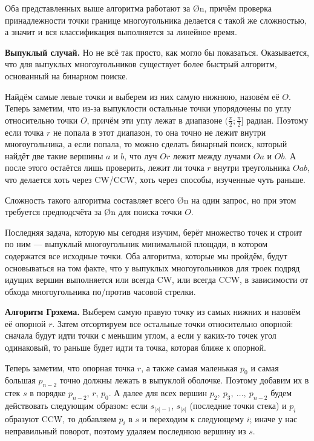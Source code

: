 Оба представленных выше алгоритма работают за \O{n}, причём проверка принадлежности точки границе многоугольника делается с такой же сложностью, а значит и вся классификация выполняется за линейное время.

\textbf{Выпуклый случай.} Но не всё так просто, как могло бы показаться. Оказывается, что для выпуклых многоугольников существует более быстрый алгоритм, основанный на бинарном поиске.

Найдём самые левые точки и выберем из них самую нижнюю, назовём её $O$. Теперь заметим, что из-за выпуклости остальные точки упорядочены по углу относительно точки $O$, причём эти углу лежат в диапазоне $(\frac{\pi}{2}; \frac{\pi}{2}]$ радиан. Поэтому если точка $r$ не попала в этот диапазон, то она точно не лежит внутри многоугольника, а если попала, то можно сделать бинарный поиск, который найдёт две такие вершины $a$ и $b$, что луч $Or$ лежит между лучами $Oa$ и $Ob$. А после этого остаётся лишь проверить, лежит ли точка $r$ внутри треугольника $Oab$, что делается хоть через CW/CCW, хоть через способы, изученные чуть раньше.

Сложность такого алгоритма составляет всего \O{\log n} на один запрос, но при этом требуется предподсчёта за \O{n} для поиска точки $O$.


Последняя задача, которую мы сегодня изучим, берёт множество точек и строит по ним  — выпуклый многоугольник минимальной площади, в котором содержатся все исходные точки. Оба алгоритма, которые мы пройдём, будут основываться на том факте, что у выпуклых многоугольников для троек подряд идущих вершин выполняется или всегда CW, или всегда CCW, в зависимости от обхода многоугольника по/против часовой стрелки.

\textbf{Алгоритм Грэхема.} Выберем самую правую точку из самых нижних и назовём её опорной $r$. Затем отсортируем все остальные точки относительно опорной: сначала будут идти точки с меньшим углом, а если у каких-то точек угол одинаковый, то раньше будет идти та точка, которая ближе к опорной.

Теперь заметим, что опорная точка $r$, а также самая маленькая $p_0$ и самая большая $p_{n-2}$ точно должны лежать в выпуклой оболочке. Поэтому добавим их в стек $s$ в порядке $p_{n-2}$, $r$, $p_0$. А далее для всех вершин $p_2,\ p_3,\ \ldots,\ p_{n-2}$ будем действовать следующим образом: если $s_{|s|-1}$, $s_{|s|}$ (последние точки стека) и $p_i$ образуют CCW, то добавляем $p_i$ в $s$ и переходим к следующему $i$; иначе у нас неправильный поворот, поэтому удаляем последнюю вершину из $s$.

